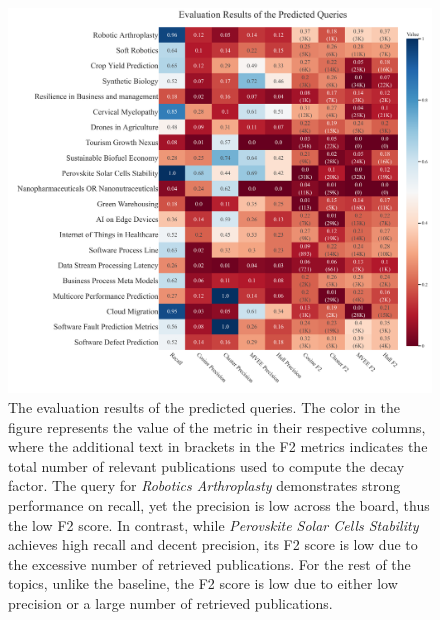 \documentclass[%
  a4paper,fontsize=11pt,abstract=on,%
  oneside,BCOR=19mm,%
  final %
]{scrreprt}
\begin{document}
\begin{figure}
	\hspace*{-4cm}	
	\includegraphics[scale=0.6]{pics/predicted_results.pdf}
	\caption[Predicted Queries Results]{The evaluation results of the predicted queries. The color in the figure represents the value of the metric in their respective columns, where the additional text in brackets in the F2 metrics indicates the total number of relevant publications used to compute the decay factor. The query for \textit{Robotics Arthroplasty} demonstrates strong performance on recall, yet the precision is low across the board, thus the low F2 score. In contrast, while \textit{Perovskite Solar Cells Stability} achieves high recall and decent precision, its F2 score is low due to the excessive number of retrieved publications. For the rest of the topics, unlike the baseline, the F2 score is low due to either low precision or a large number of retrieved publications.}
\end{figure}
\end{document}
